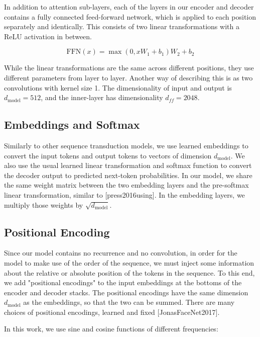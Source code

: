 \documentclass[11pt,a4paper]{article}
\begin{document}
In addition to attention sub-layers, each of the layers in our encoder and decoder contains a fully connected feed-forward network, which is applied to each position separately and identically.  This consists of two linear transformations with a ReLU activation in between.

$$\begin{equation}
   \mathrm{FFN}(x)=\max(0, xW_1 + b_1) W_2 + b_2
\end{equation}$$

While the linear transformations are the same across different positions, they use different parameters from layer to layer. Another way of describing this is as two convolutions with kernel size 1.  The dimensionality of input and output is $d_{\text{model}}=512$, and the inner-layer has dimensionality $d_{ff}=2048$.

\subsection{Embeddings and Softmax}

Similarly to other sequence transduction models, we use learned embeddings to convert the input tokens and output tokens to vectors of dimension $d_{\text{model}}$.  We also use the usual learned linear transformation and softmax function to convert the decoder output to predicted next-token probabilities.  In our model, we share the same weight matrix between the two embedding layers and the pre-softmax linear transformation, similar to [press2016using].   In the embedding layers, we multiply those weights by $\sqrt{d_{\text{model}}}$.

\subsection{Positional Encoding}

Since our model contains no recurrence and no convolution, in order for the model to make use of the order of the sequence, we must inject some information about the relative or absolute position of the tokens in the sequence.  To this end, we add "positional encodings" to the input embeddings at the bottoms of the encoder and decoder stacks.  The positional encodings have the same dimension $d_{\text{model}}$ as the embeddings, so that the two can be summed.   There are many choices of positional encodings, learned and fixed [JonasFaceNet2017].

In this work, we use sine and cosine functions of different frequencies:
\end{document}
